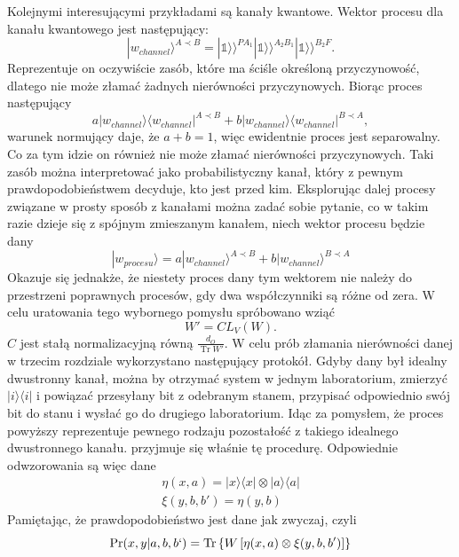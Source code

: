 \documentclass[10pt]{article} %
\DeclareMathOperator{\Trs}{Tr}
\newcommand{\Ket}[1]{|#1\rangle}
\newcommand{\Bra}[1]{\langle#1|}
\newcommand{\KKet}[1]{|#1\rangle\rangle}
\newcommand{\I}{\mathbb{1}}
\begin{document}
Kolejnymi interesującymi przykładami są kanały kwantowe. Wektor procesu dla kanału kwantowego jest następujący:
\begin{equation}
\Ket{w_{channel}}^{A \prec B} = \KKet{\I}^{PA_1}\KKet{\I}^{A_2B_1}\KKet{\I}^{B_2F}.
\end{equation}
Reprezentuje on oczywiście zasób, które ma ściśle określoną przyczynowość, dlatego nie może złamać żadnych nierówności przyczynowych.
Biorąc proces następujący
\begin{equation}
a\Ket{w_{channel}}\Bra{w_{channel}}^{A \prec B} + b\Ket{w_{channel}}\Bra{w_{channel}}^{B \prec A},
\end{equation} warunek normujący daje, że $a+b=1$, więc ewidentnie proces jest separowalny. Co za tym idzie on również nie może złamać nierówności przyczynowych. Taki zasób można interpretować jako probabilistyczny kanał, który z pewnym prawdopodobieństwem decyduje, kto jest przed kim.
Eksplorując dalej procesy związane w prosty sposób z kanałami można zadać sobie pytanie, co w takim razie dzieje się z spójnym zmieszanym kanałem, niech wektor procesu będzie dany
\begin{equation}
\Ket{w_{procesu}} = a\Ket{w_{channel}}^{A \prec B} + b\Ket{w_{channel}}^{B \prec A}
\end{equation}
Okazuje się jednakże, że niestety proces dany tym wektorem nie należy do przestrzeni poprawnych procesów, gdy dwa współczynniki są różne od zera. W celu uratowania tego wybornego pomysłu spróbowano wziąć 
\begin{equation}
W' = CL_V(W).
\end{equation}
$C$ jest stałą normalizacyjną równą $\frac{d_O}{\Trs W'}$.
W celu prób złamania nierówności danej w trzecim rozdziale wykorzystano następujący protokół. Gdyby dany był idealny dwustronny kanał, można by otrzymać system w jednym laboratorium, zmierzyć $\Ket{i}\Bra{i}$ i powiązać przesyłany bit z odebranym stanem, przypisać odpowiednio swój bit do stanu i wysłać go do drugiego laboratorium. Idąc za pomysłem, że proces powyższy reprezentuje pewnego rodzaju pozostałość z takiego idealnego dwustronnego kanału. przyjmuje się właśnie tę procedurę. Odpowiednie odwzorowania są więc dane
\begin{gather}
\eta(x,a) = \Ket{x}\Bra{x} \otimes \Ket{a}\Bra{a} \\
\xi(y,b,b') = \eta(y,b)
\end{gather}
Pamiętając, że prawdopodobieństwo jest dane jak zwyczaj, czyli
\begin{equation}
\Pr(x,y|a,b,b`) = \Trs\left\{{W\left[\eta(x,a) \otimes \xi(y,b,b') \right]}\right\}
\end{equation}
\end{document}
